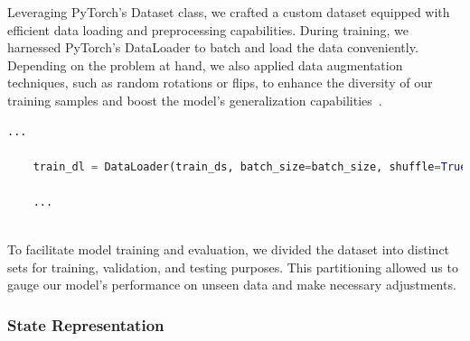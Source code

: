 Leveraging PyTorch's Dataset class, we crafted a custom dataset equipped with efficient data loading and preprocessing capabilities. 
During training, we harnessed PyTorch's DataLoader to batch and load the data conveniently. 
Depending on the problem at hand, we also applied data augmentation techniques, such as random rotations or flips, 
to enhance the diversity of our training samples and boost the model's generalization capabilities~\cite{Onl:dataAug}.

\begin{lstlisting}[language=Python]
    ...

    train_dl = DataLoader(train_ds, batch_size=batch_size, shuffle=True)

    ...
    
\end{lstlisting}

To facilitate model training and evaluation, we divided the dataset into distinct sets for training, validation, 
and testing purposes. This partitioning allowed us to gauge our model's performance on unseen data and make necessary adjustments.

\subsubsection{State Representation}


